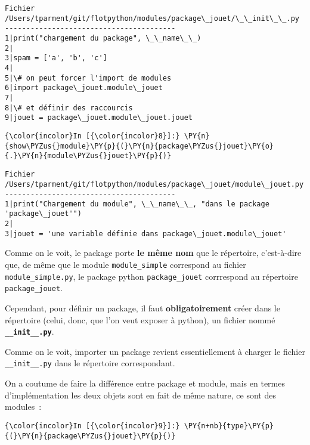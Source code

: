     \begin{Verbatim}[commandchars=\\\{\}]
Fichier /Users/tparment/git/flotpython/modules/package\_jouet/\_\_init\_\_.py
----------------------------------------
1|print("chargement du package", \_\_name\_\_)
2|
3|spam = ['a', 'b', 'c']
4|
5|\# on peut forcer l'import de modules
6|import package\_jouet.module\_jouet
7|
8|\# et définir des raccourcis
9|jouet = package\_jouet.module\_jouet.jouet

    \end{Verbatim}

    \begin{Verbatim}[commandchars=\\\{\}]
{\color{incolor}In [{\color{incolor}8}]:} \PY{n}{show\PYZus{}module}\PY{p}{(}\PY{n}{package\PYZus{}jouet}\PY{o}{.}\PY{n}{module\PYZus{}jouet}\PY{p}{)}
\end{Verbatim}


    \begin{Verbatim}[commandchars=\\\{\}]
Fichier /Users/tparment/git/flotpython/modules/package\_jouet/module\_jouet.py
----------------------------------------
1|print("Chargement du module", \_\_name\_\_, "dans le package 'package\_jouet'")
2|
3|jouet = 'une variable définie dans package\_jouet.module\_jouet'

    \end{Verbatim}

    Comme on le voit, le package porte \textbf{le même nom} que le
répertoire, c'est-à-dire que, de même que le module
\texttt{module\_simple} correspond au fichier
\texttt{module\_simple.py}, le package python \texttt{package\_jouet}
corrrespond au répertoire \texttt{package\_jouet}.

    Cependant, pour définir un package, il faut \textbf{obligatoirement}
créer dans le répertoire (celui, donc, que l'on veut exposer à python),
un fichier nommé \textbf{\texttt{\_\_init\_\_.py}}.

Comme on le voit, importer un package revient essentiellement à charger
le fichier \texttt{\_\_init\_\_.py} dans le répertoire correspondant.

    On a coutume de faire la différence entre package et module, mais en
termes d'implémentation les deux objets sont en fait de même nature, ce
sont des modules~:

    \begin{Verbatim}[commandchars=\\\{\}]
{\color{incolor}In [{\color{incolor}9}]:} \PY{n+nb}{type}\PY{p}{(}\PY{n}{package\PYZus{}jouet}\PY{p}{)}
\end{Verbatim}


